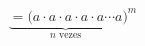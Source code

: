 \documentclass[preview]{standalone}
\begin{document}
\begin{align*}
\underbrace{=(a \cdot a \cdot a \cdot a \cdot a \cdots a}_{n \text{ vezes}})^m
\end{align*}
\end{document}
